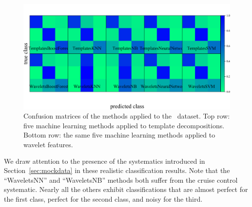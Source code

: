 \begin{figure}
	\begin{center}
    \includegraphics[width=\textwidth]{./fig/all_snphotcc_cm.png}
		\caption{Confusion matrices of the \citet{lochner_photometric_2016} methods applied to the \snphotcc\ dataset.
    Top row: five machine learning methods applied to template decompositions.
    Bottom row: the same five machine learning methods applied to wavelet features.}
		\label{fig:snphotcc_cm}
	\end{center}
\end{figure}

We draw attention to the presence of the systematics introduced in Section~\ref{sec:mockdata} in these realistic classification results.
Note that the ``WaveletsNN'' and ``WaveletsNB'' methods both suffer from the cruise control systematic.
Nearly all the others exhibit classifications that are almost perfect for the first class, perfect for the second class, and noisy for the third.

%
